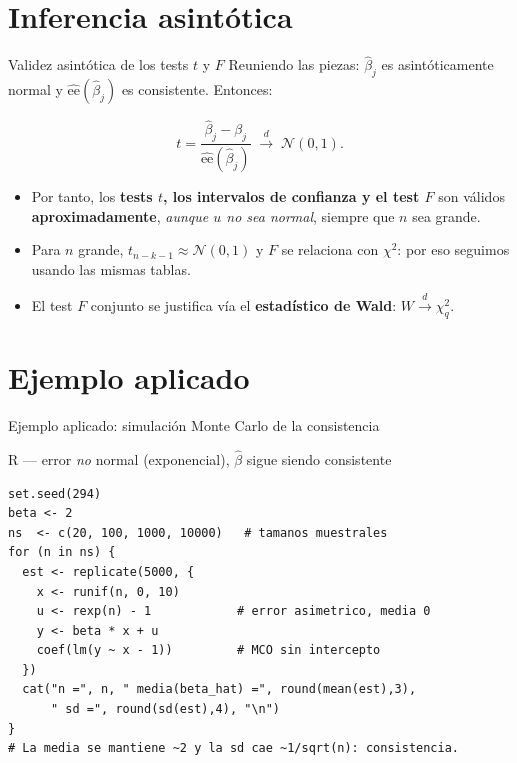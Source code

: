 \documentclass{beamer}
\begin{document}
\section{Inferencia asintótica}

\begin{frame}{Validez asintótica de los tests $t$ y $F$}
    Reuniendo las piezas: $\hat{\beta}_j$ es asintóticamente normal y $\widehat{\text{ee}}(\hat{\beta}_j)$ es consistente. Entonces:
    \begin{tcolorbox}[colback=green!5!white, colframe=green!55!black, title=Resultado central]
    \[
    t = \frac{\hat{\beta}_j - \beta_j}{\widehat{\text{ee}}(\hat{\beta}_j)} \;\overset{d}{\to}\; \mathcal{N}(0,1).
    \]
    \end{tcolorbox}
    \pause
    \begin{itemize}
        \item Por tanto, los \textbf{tests $t$, los intervalos de confianza y el test $F$} son válidos \textbf{aproximadamente}, \emph{aunque $u$ no sea normal}, siempre que $n$ sea grande.
        \pause
        \item Para $n$ grande, $t_{n-k-1}\approx\mathcal{N}(0,1)$ y $F$ se relaciona con $\chi^2$: por eso seguimos usando las mismas tablas.
        \pause
        \item El test $F$ conjunto se justifica vía el \textbf{estadístico de Wald}: $W\overset{d}{\to}\chi^2_q$.
    \end{itemize}
\end{frame}

\section{Ejemplo aplicado}

\begin{frame}[fragile]{Ejemplo aplicado: simulación Monte Carlo de la consistencia}
\begin{exampleblock}{R — error \emph{no} normal (exponencial), $\hat{\beta}$ sigue siendo consistente}
\begin{verbatim}
set.seed(294)
beta <- 2
ns  <- c(20, 100, 1000, 10000)   # tamanos muestrales
for (n in ns) {
  est <- replicate(5000, {
    x <- runif(n, 0, 10)
    u <- rexp(n) - 1            # error asimetrico, media 0
    y <- beta * x + u
    coef(lm(y ~ x - 1))         # MCO sin intercepto
  })
  cat("n =", n, " media(beta_hat) =", round(mean(est),3),
      " sd =", round(sd(est),4), "\n")
}
# La media se mantiene ~2 y la sd cae ~1/sqrt(n): consistencia.
\end{verbatim}
\end{exampleblock}
\end{frame}
\end{document}
